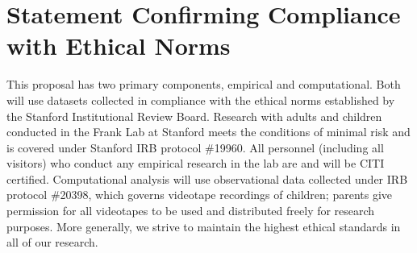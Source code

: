 \documentclass[12pt]{article}
\begin{document}
\newpage

\section*{Statement Confirming Compliance with Ethical Norms}
 
This proposal has two primary components, empirical and computational. Both will use datasets collected in compliance with the ethical norms established by the Stanford Institutional Review Board. Research with adults and children conducted in the Frank Lab at Stanford meets the conditions of minimal risk and is covered under Stanford IRB protocol \#19960. All personnel (including all visitors) who conduct any empirical research in the lab are and will be CITI certified. Computational analysis will use observational data collected under IRB protocol \#20398, which governs videotape recordings of children; parents give permission for all videotapes to be used and distributed freely for research purposes. More generally, we strive to maintain the highest ethical standards in all of our research. 
\end{document}
